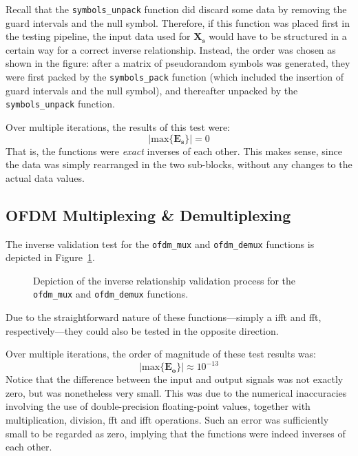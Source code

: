 \documentclass[class=report,11pt,crop=false]{standalone}
\begin{document}
Recall that the \texttt{symbols\_unpack} function did discard some data by removing the guard intervals and the null symbol. Therefore, if this function was placed first in the testing pipeline, the input data used for \(\mathbf{X_s}\) would have to be structured in a certain way for a correct inverse relationship. Instead, the order was chosen as shown in the figure: after a matrix of pseudorandom symbols was generated, they were first packed by the \texttt{symbols\_pack} function (which included the insertion of guard intervals and the null symbol), and thereafter unpacked by the \texttt{symbols\_unpack} function.

Over multiple iterations, the results of this test were:
\begin{equation}
  \left| \mathrm{max} \{ \mathbf{E_s} \} \right| = 0
\end{equation}
That is, the functions were \emph{exact} inverses of each other. This makes sense, since the data was simply rearranged in the two sub-blocks, without any changes to the actual data values.

\subsection{OFDM Multiplexing \& Demultiplexing}
The inverse validation test for the \texttt{ofdm\_mux} and \texttt{ofdm\_demux} functions is depicted in Figure~\ref{fig:inverse-ofdm-mux-demux}.

\begin{figure}[htbp]
  \centering
  \captionsetup{type=figure}
  \def\svgwidth{0.95\linewidth}
  { %
      }
  \caption{Depiction of the inverse relationship validation process for the \texttt{ofdm\_mux} and \texttt{ofdm\_demux} functions.}
  \label{fig:inverse-ofdm-mux-demux}
\end{figure}

Due to the straightforward nature of these functions---simply a \gls{ifft} and \gls{fft}, respectively---they could also be tested in the opposite direction.

Over multiple iterations, the order of magnitude of these test results was:
\begin{equation}
  \left| \mathrm{max} \{ \mathbf{E_o} \} \right| \approx 10^{-13}
\end{equation}
Notice that the difference between the input and output signals was not exactly zero, but was nonetheless very small. This was due to the numerical inaccuracies involving the use of double-precision floating-point values, together with multiplication, division, \gls{fft} and \gls{ifft} operations. Such an error was sufficiently small to be regarded as zero, implying that the functions were indeed inverses of each other.
\end{document}
